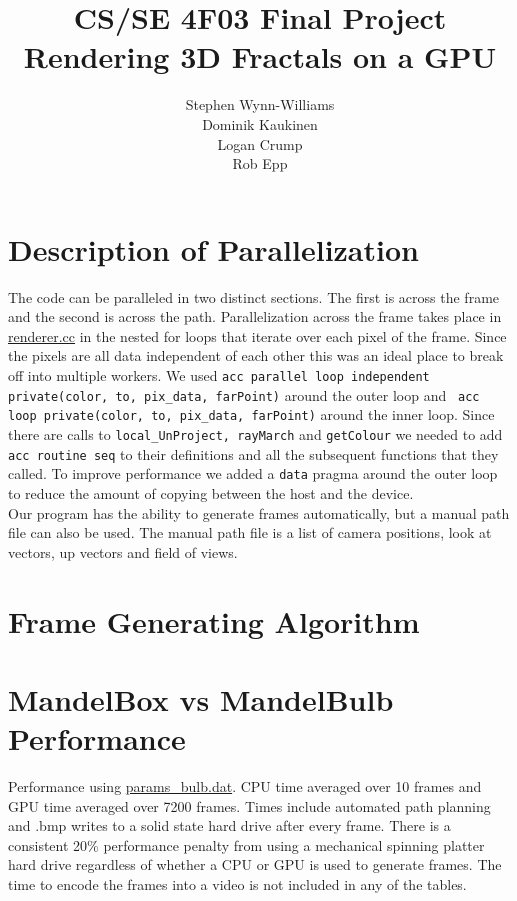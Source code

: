 \documentclass[]{article}
\title{CS/SE 4F03 Final Project \\ Rendering 3D Fractals on a GPU}
\author{Stephen Wynn-Williams \\ Dominik Kaukinen \\Logan Crump \\ Rob Epp }
\begin{document}
\maketitle

\section*{Description of Parallelization}
The code can be paralleled in two distinct sections. The first is across the frame and the second is across the path. Parallelization across the frame takes place in \hyperref[subsec:renderer.cc]{renderer.cc} in the nested for loops that iterate over each pixel of the frame. Since the pixels are all data independent of each other this was an ideal place to break off into multiple workers. We used \texttt{acc parallel loop independent private(color, to, pix\_data, farPoint)} around the outer loop and \texttt{ acc loop private(color, to, pix\_data, farPoint)} around the inner loop. Since there are calls to \texttt{local\_UnProject, rayMarch} and \texttt{getColour} we needed to add \texttt{acc routine seq} to their definitions and all the subsequent functions that they called. To improve performance we added a \texttt{data} pragma around the outer loop to reduce the amount of copying between the host and the device. \\
Our program has the ability to generate frames automatically, but a manual path file can also be used. The manual path file is a list of camera positions, look at vectors, up vectors and field of views.

\section*{Frame Generating Algorithm}

\section*{MandelBox vs MandelBulb Performance }
Performance using \hyperref[subsec:params_bulb]{params\_bulb.dat}. CPU time averaged over 10 frames and GPU time averaged over 7200 frames. Times include automated path planning and .bmp writes to a solid state hard drive after every frame. There is a consistent 20\% performance penalty from using a mechanical spinning platter hard drive regardless of whether a CPU or GPU is used to generate frames. The time to encode the frames into a video is not included in any of the tables.
\end{document}
